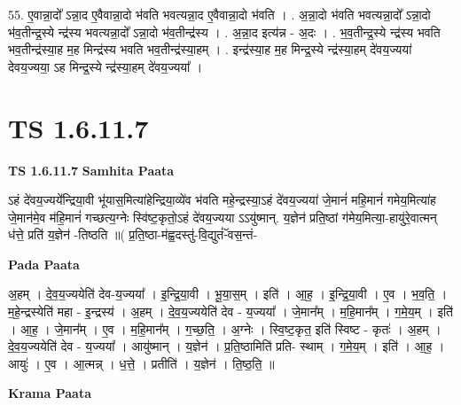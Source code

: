 \documentclass[17pt]{extarticle}
\begin{document}
55. ए॒वान्ना॒दो᳚ ऽन्ना॒द ए॒वैवान्ना॒दो भ॑वति भवत्यन्ना॒द ए॒वैवान्ना॒दो भ॑वति । . अ॒न्ना॒दो भ॑वति भवत्यन्ना॒दो᳚ ऽन्ना॒दो भ॑व॒तीन्द्र॒स्ये न्द्र॑स्य भवत्यन्ना॒दो᳚ ऽन्ना॒दो भ॑व॒तीन्द्र॑स्य । . अ॒न्ना॒द इत्य॑न्न - अ॒दः । . भ॒व॒तीन्द्र॒स्ये न्द्र॑स्य भवति भव॒तीन्द्र॑स्या॒ह म॒ह मिन्द्र॑स्य भवति भव॒तीन्द्र॑स्या॒हम् । . इन्द्र॑स्या॒ह म॒ह मिन्द्र॒स्ये न्द्र॑स्या॒हम् दे॑वय॒ज्यया॑ देवय॒ज्यया॒ ऽह मिन्द्र॒स्ये न्द्र॑स्या॒हम् दे॑वय॒ज्यया᳚ । \newline
\pagebreak
{}

\section{ TS 1.6.11.7 }

\textbf{TS 1.6.11.7 } \newline
\textbf{Samhita Paata} \newline

ऽहं दे॑वय॒ज्यये᳚न्द्रिया॒वी भू॑यास॒मित्या॑हेन्द्रिया॒व्ये॑व भ॑वति महे॒न्द्रस्या॒ऽहं दे॑वय॒ज्यया॑ जे॒मानं॑ महि॒मानं॑ गमेय॒मित्या॑ह जे॒मान॑मे॒व म॑हि॒मानं॑ गच्छत्य॒ग्नेः स्वि॑ष्ट॒कृतो॒ऽहं दे॑वय॒ज्यया ऽऽयु॑ष्मान्. य॒ज्ञेन॑ प्रति॒ष्ठां ग॑मेय॒मित्या॒-हायु॑रे॒वात्मन् ध॑त्ते॒ प्रति॑ य॒ज्ञेन॑ -तिष्ठति ॥( प्र॒ति॒ष्ठा-म॑ह्व॒दस्तु॑-वि॒द्युतं॑-ॅवस॒न्तं- \newline

\textbf{Pada Paata} \newline

अ॒हम् । दे॒व॒य॒ज्ययेति॑ देव-य॒ज्यया᳚ । इ॒न्द्रि॒या॒वी । भू॒या॒स॒म् । इति॑ । आ॒ह॒ । इ॒न्द्रि॒या॒वी । ए॒व । भ॒व॒ति॒ । म॒हे॒न्द्रस्येति॑ महा - इ॒न्द्रस्य॑ । अ॒हम् । दे॒व॒य॒ज्ययेति॑ देव - य॒ज्यया᳚ । जे॒मान᳚म् । म॒हि॒मान᳚म् । ग॒मे॒य॒म् । इति॑ । आ॒ह॒ । जे॒मान᳚म् । ए॒व । म॒हि॒मान᳚म् । ग॒च्छ॒ति॒ । अ॒ग्नेः । स्वि॒ष्ट॒कृत॒ इति॑ स्विष्ट - कृतः॑ । अ॒हम् । दे॒व॒य॒ज्ययेति॑ देव - य॒ज्यया᳚ । आयु॑ष्मान् । य॒ज्ञेन॑ । प्र॒ति॒ष्ठामिति॑ प्रति- स्थाम् । ग॒मे॒य॒म् । इति॑ । आ॒ह॒ । आयुः॑ । ए॒व । आ॒त्मन्न् । ध॒त्ते॒ । प्रतीति॑ । य॒ज्ञेन॑ । ति॒ष्ठ॒ति॒ ॥  \newline


\textbf{Krama Paata} \newline
\end{document}
